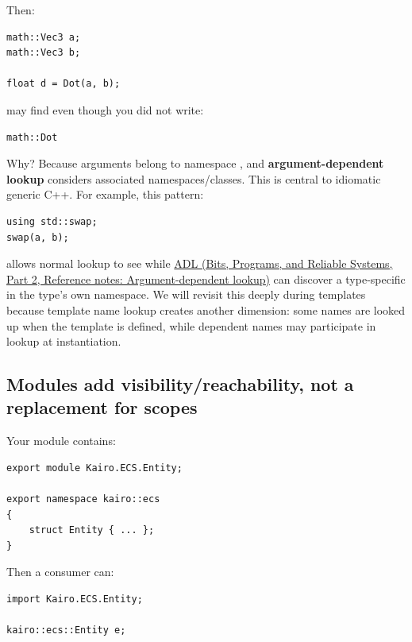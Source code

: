 Then:

\begin{verbatim}
math::Vec3 a;
math::Vec3 b;

float d = Dot(a, b);
\end{verbatim}

may find  even though you did not write:

\begin{verbatim}
math::Dot
\end{verbatim}

Why? Because arguments belong to namespace , and \textbf{argument-dependent lookup} considers associated namespaces/classes. This is central to idiomatic generic C++. For example, this pattern:

\begin{verbatim}
using std::swap;
swap(a, b);
\end{verbatim}

allows normal lookup to see  while \href{../01-Bits-Programs-and-Reliable-Systems-P02/main.pdf\#nameddest=appendix-7863714aa97f}{ADL (Bits, Programs, and Reliable Systems, Part 2, Reference notes: Argument-dependent lookup)} can discover a type-specific  in the type's own namespace. We will revisit this deeply during templates because template name lookup creates another dimension: some names are looked up when the template is defined, while dependent names may participate in lookup at instantiation.

\subsection{Modules add visibility/reachability, not a replacement for scopes}\label{05-engine-i-ch002-modules-add-visibilityreachability-not-a-replacement-for-scopes}

\hypertarget{05-engine-i-ch002-modules-add-visibilityreachability-not-a-replacement-for-scopes}{}

Your module contains:

\begin{verbatim}
export module Kairo.ECS.Entity;

export namespace kairo::ecs
{
    struct Entity { ... };
}
\end{verbatim}

Then a consumer can:

\begin{verbatim}
import Kairo.ECS.Entity;

kairo::ecs::Entity e;
\end{verbatim}

